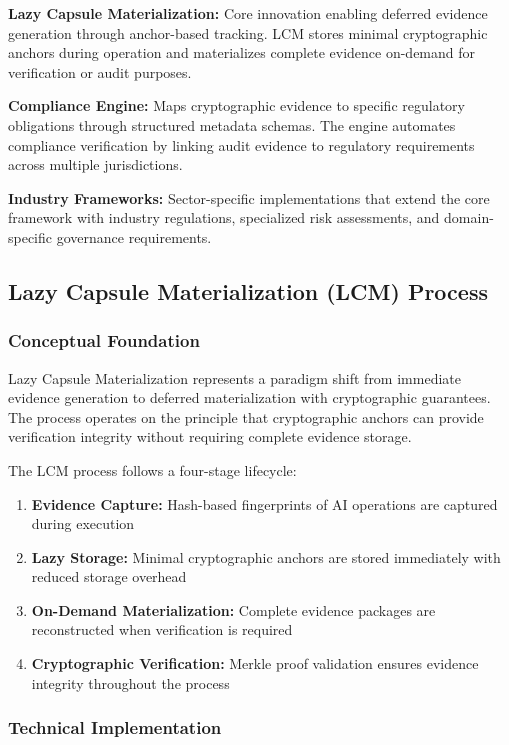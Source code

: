 \documentclass[12pt,a4paper]{article}
\begin{document}
\textbf{Lazy Capsule Materialization:} Core innovation enabling deferred evidence generation through anchor-based tracking. LCM stores minimal cryptographic anchors during operation and materializes complete evidence on-demand for verification or audit purposes.

\textbf{Compliance Engine:} Maps cryptographic evidence to specific regulatory obligations through structured metadata schemas. The engine automates compliance verification by linking audit evidence to regulatory requirements across multiple jurisdictions.

\textbf{Industry Frameworks:} Sector-specific implementations that extend the core framework with industry regulations, specialized risk assessments, and domain-specific governance requirements.

\subsection{Lazy Capsule Materialization (LCM) Process}

\subsubsection{Conceptual Foundation}

Lazy Capsule Materialization represents a paradigm shift from immediate evidence generation to deferred materialization with cryptographic guarantees. The process operates on the principle that cryptographic anchors can provide verification integrity without requiring complete evidence storage.

The LCM process follows a four-stage lifecycle:

\begin{enumerate}
\item \textbf{Evidence Capture:} Hash-based fingerprints of AI operations are captured during execution
\item \textbf{Lazy Storage:} Minimal cryptographic anchors are stored immediately with reduced storage overhead
\item \textbf{On-Demand Materialization:} Complete evidence packages are reconstructed when verification is required
\item \textbf{Cryptographic Verification:} Merkle proof validation ensures evidence integrity throughout the process
\end{enumerate}

\subsubsection{Technical Implementation}
\end{document}
